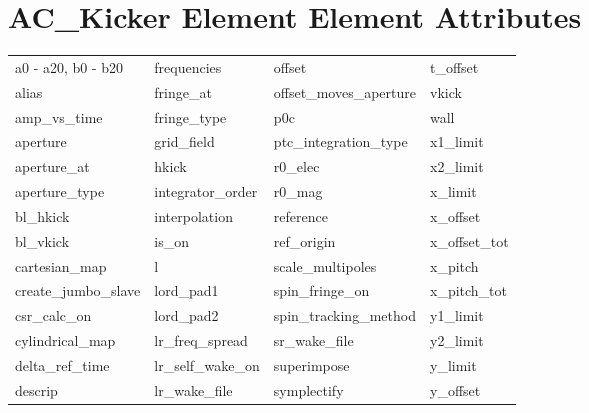  \section{AC_Kicker Element Element Attributes}
 \label{s:list.ac.kicker}
 
 \begin{tabular}{llll} \toprule
a0 - a20, b0 - b20          & frequencies                 & offset                      & t_offset                    \\
alias                       & fringe_at                   & offset_moves_aperture       & vkick                       \\
amp_vs_time                 & fringe_type                 & p0c                         & wall                        \\
aperture                    & grid_field                  & ptc_integration_type        & x1_limit                    \\
aperture_at                 & hkick                       & r0_elec                     & x2_limit                    \\
aperture_type               & integrator_order            & r0_mag                      & x_limit                     \\
bl_hkick                    & interpolation               & reference                   & x_offset                    \\
bl_vkick                    & is_on                       & ref_origin                  & x_offset_tot                \\
cartesian_map               & l                           & scale_multipoles            & x_pitch                     \\
create_jumbo_slave          & lord_pad1                   & spin_fringe_on              & x_pitch_tot                 \\
csr_calc_on                 & lord_pad2                   & spin_tracking_method        & y1_limit                    \\
cylindrical_map             & lr_freq_spread              & sr_wake_file                & y2_limit                    \\
delta_ref_time              & lr_self_wake_on             & superimpose                 & y_limit                     \\
descrip                     & lr_wake_file                & symplectify                 & y_offset                    \\

\end{tabular}
